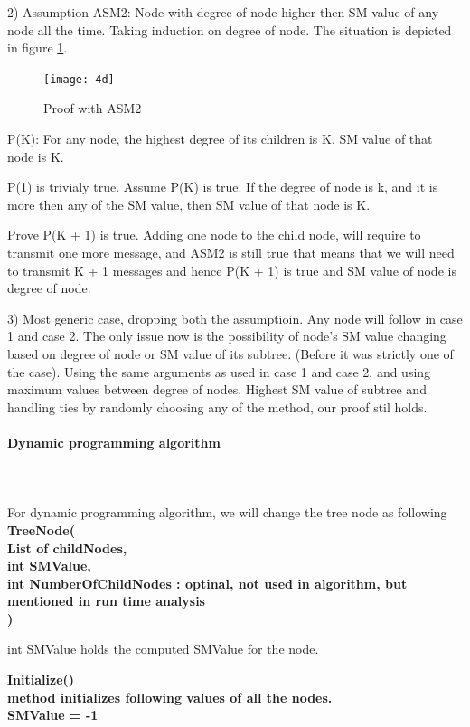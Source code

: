 2) Assumption ASM2: Node with degree of node higher then SM value of any node all the time. 
Taking induction on degree of node. The situation is depicted in figure \ref{fig:4d}. 

\begin{figure}[4d]
    \centering
    \texttt{[image: 4d]}
    \caption{Proof with ASM2}
    \label{fig:4d}
\end{figure}
 
P(K): For any node, the highest degree of  its children is K, SM value of that node is K. 

P(1) is trivialy true. 
Assume P(K) is true. If the degree of node is k, and it is more then any of the SM value, then SM value of that node is K.  

Prove P(K + 1) is true. 
Adding one node to the child node, will require to transmit one more message, and ASM2 is still true that means that we will need to transmit K + 1 messages and hence P(K + 1) is true and SM value of node is degree of node.  

3) Most generic case, dropping both the assumptioin. 
Any node will follow in case 1 and case 2. The only issue now is the possibility of node's SM value changing based on degree of node or SM value of its subtree. (Before it was strictly one of the case). Using the same arguments as used in case 1 and case 2, and using maximum values between {degree of nodes, Highest SM  value of subtree} and handling ties by randomly choosing any of the method, our proof stil holds. 

\paragraph{Dynamic programming algorithm} \\
\\
For dynamic programming algorithm, we will change the tree node as following \\
\textbf{TreeNode(\\
List of childNodes,  \\
int SMValue, \\
int NumberOfChildNodes : optinal, not used in algorithm, but mentioned in run time analysis \\
)}


int SMValue holds the computed SMValue for the node. 

\textbf{Initialize() \\
method initializes following values of all the nodes. \\
SMValue = -1\\
\\
}


